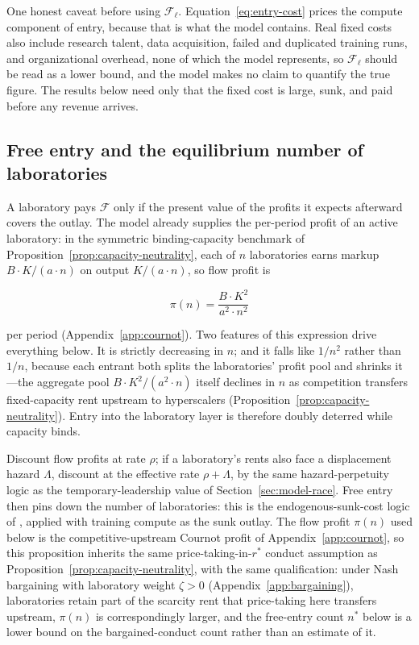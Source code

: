 \documentclass[11pt]{article}
\begin{document}
One honest caveat before using $\mathcal F_\ell$. Equation~\eqref{eq:entry-cost} prices the compute component of entry, because that is what the model contains. Real fixed costs also include research talent, data acquisition, failed and duplicated training runs, and organizational overhead, none of which the model represents, so $\mathcal F_\ell$ should be read as a lower bound, and the model makes no claim to quantify the true figure. The results below need only that the fixed cost is large, sunk, and paid before any revenue arrives.

\subsection{Free entry and the equilibrium number of laboratories}
\label{subsec:free-entry}

A laboratory pays $\mathcal F$ only if the present value of the profits it expects afterward covers the outlay. The model already supplies the per-period profit of an active laboratory: in the symmetric binding-capacity benchmark of Proposition~\ref{prop:capacity-neutrality}, each of $n$ laboratories earns markup $B\cdot K/(a\cdot n)$ on output $K/(a\cdot n)$, so flow profit is

\begin{equation}\pi(n)=\frac{B\cdot K^{2}}{a^{2}\cdot n^{2}}\end{equation}

per period (Appendix~\ref{app:cournot}). Two features of this expression drive everything below. It is strictly decreasing in $n$; and it falls like $1/n^{2}$ rather than $1/n$, because each entrant both splits the laboratories' profit pool and shrinks it---the aggregate pool $B\cdot K^{2}/(a^{2}\cdot n)$ itself declines in $n$ as competition transfers fixed-capacity rent upstream to hyperscalers (Proposition~\ref{prop:capacity-neutrality}). Entry into the laboratory layer is therefore doubly deterred while capacity binds.

Discount flow profits at rate $\rho$; if a laboratory's rents also face a displacement hazard $\Lambda$, discount at the effective rate $\rho+\Lambda$, by the same hazard-perpetuity logic as the temporary-leadership value of Section~\ref{sec:model-race}. Free entry then pins down the number of laboratories: this is the endogenous-sunk-cost logic of \citet{sutton1991}, applied with training compute as the sunk outlay. The flow profit $\pi(n)$ used below is the competitive-upstream Cournot profit of Appendix~\ref{app:cournot}, so this proposition inherits the same price-taking-in-$r^*$ conduct assumption as Proposition~\ref{prop:capacity-neutrality}, with the same qualification: under Nash bargaining with laboratory weight $\zeta>0$ (Appendix~\ref{app:bargaining}), laboratories retain part of the scarcity rent that price-taking here transfers upstream, $\pi(n)$ is correspondingly larger, and the free-entry count $n^*$ below is a lower bound on the bargained-conduct count rather than an estimate of it.
\end{document}
